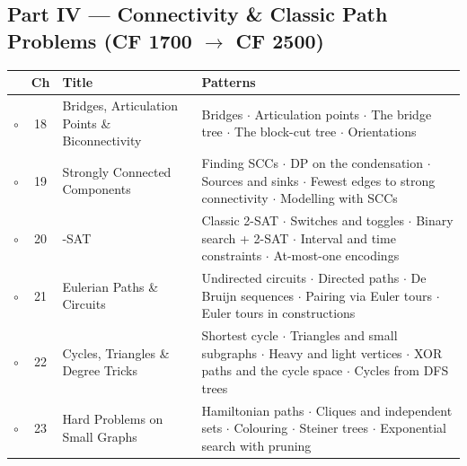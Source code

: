 \subsection*{Part IV --- Connectivity \& Classic Path Problems (CF 1700 $\to$ CF 2500)}
\begin{tabularx}{\linewidth}{@{}c c >{\raggedright\arraybackslash}p{3.6cm} X@{}}
\toprule
& \textbf{Ch} & \textbf{Title} & \textbf{Patterns} \\
\midrule
$\circ$ & 18 & Bridges, Articulation Points \& Biconnectivity & Bridges $\cdot$ Articulation points $\cdot$ The bridge tree $\cdot$ The block-cut tree $\cdot$ Orientations \\
$\circ$ & 19 & Strongly Connected Components & Finding SCCs $\cdot$ DP on the condensation $\cdot$ Sources and sinks $\cdot$ Fewest edges to strong connectivity $\cdot$ Modelling with SCCs \\
$\circ$ & 20 & 2-SAT & Classic 2-SAT $\cdot$ Switches and toggles $\cdot$ Binary search + 2-SAT $\cdot$ Interval and time constraints $\cdot$ At-most-one encodings \\
$\circ$ & 21 & Eulerian Paths \& Circuits & Undirected circuits $\cdot$ Directed paths $\cdot$ De Bruijn sequences $\cdot$ Pairing via Euler tours $\cdot$ Euler tours in constructions \\
$\circ$ & 22 & Cycles, Triangles \& Degree Tricks & Shortest cycle $\cdot$ Triangles and small subgraphs $\cdot$ Heavy and light vertices $\cdot$ XOR paths and the cycle space $\cdot$ Cycles from DFS trees \\
$\circ$ & 23 & Hard Problems on Small Graphs & Hamiltonian paths $\cdot$ Cliques and independent sets $\cdot$ Colouring $\cdot$ Steiner trees $\cdot$ Exponential search with pruning \\
\bottomrule
\end{tabularx}

